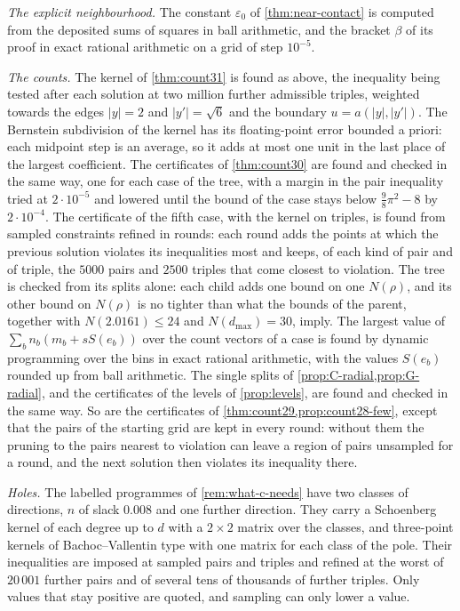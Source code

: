 \documentclass[11pt,reqno]{amsart}
\renewcommand{\_}{\origunderscore\allowbreak}
\numberwithin{equation}{section}
\theoremstyle{plain}
\theoremstyle{definition}
\theoremstyle{remark}
\begin{document}
\emph{The explicit neighbourhood.} The constant $\varepsilon_0$ of
\cref{thm:near-contact} is computed from the deposited sums of squares in
ball arithmetic, and the bracket $\beta$ of its proof in exact rational
arithmetic on a grid of step $10^{-5}$.

\emph{The counts.} The kernel of \cref{thm:count31} is found as above, the
inequality being tested after each solution at two million further
admissible triples, weighted towards the edges $|y|=2$ and $|y'|=\sqrt6$ and
the boundary $u=a(|y|,|y'|)$. The Bernstein subdivision of the kernel has
its floating-point error bounded a priori: each midpoint step is an average,
so it adds at most one unit in the last place of the largest coefficient.
The certificates of \cref{thm:count30} are found and checked in the same
way, one for each case of the tree, with a margin in the pair inequality
tried at $2\cdot10^{-5}$ and lowered until the bound of the case stays below
$\frac98\pi^2-8$ by $2\cdot10^{-4}$. The certificate of the fifth case,
with the kernel on triples, is found from sampled constraints refined in
rounds: each round adds the points at which the previous solution violates
its inequalities most and keeps, of each kind of pair and of triple, the
$5000$ pairs and $2500$ triples that come closest to violation. The tree is checked from its splits
alone: each child adds one bound on one $N(\rho)$, and its other bound on
$N(\rho)$ is no tighter than what the bounds of the parent, together with
$N(2.0161)\le24$ and $N(d_{\max})=30$, imply. The largest value of
$\sum_bn_b(m_b+sS(e_b))$ over the count vectors of a case is found by
dynamic programming over the bins in exact rational arithmetic, with the
values $S(e_b)$ rounded up from ball arithmetic. The single splits of
\cref{prop:C-radial,prop:G-radial}, and the certificates of the levels of
\cref{prop:levels}, are found and checked in the same way. So are the
certificates of \cref{thm:count29,prop:count28-few}, except that the pairs of
the starting grid are kept in every round: without them the pruning to the pairs nearest to
violation can leave a region of pairs unsampled for a round, and the next
solution then violates its inequality there.

\emph{Holes.} The labelled programmes of \cref{rem:what-c-needs} have two
classes of directions, $n$ of slack $0.008$ and one further direction. They
carry a Schoenberg kernel of each degree up to $d$ with a $2\times2$ matrix
over the classes, and three-point kernels of Bachoc--Vallentin type with one
matrix for each class of the pole. Their inequalities are imposed at sampled
pairs and triples and refined at the worst of $20\,001$ further pairs and of
several tens of thousands of further triples. Only values that stay positive
are quoted, and sampling can only lower a value.
\end{document}

